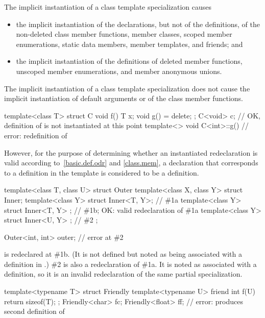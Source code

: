 \pnum
The implicit instantiation of a class template specialization causes
\begin{itemize}
\item
  the implicit instantiation of the declarations, but not of the definitions,
  of the non-deleted
  class member functions,
  member classes,
  scoped member enumerations,
  static data members,
  member templates, and
  friends; and
\item
  the implicit instantiation of the definitions of
  deleted member functions,
  unscoped member enumerations, and
  member anonymous unions.
\end{itemize}
The implicit instantiation of a class template specialization
does not cause the implicit instantiation of
default arguments or 
of the class member functions.
\begin{example}
\begin{codeblock}
template<class T>
struct C {
  void f() { T x; }
  void g() = delete;
};
C<void> c;                      // OK, definition of  is not instantiated at this point
template<> void C<int>::g() { } // error: redefinition of 
\end{codeblock}
\end{example}
However, for the purpose of determining whether an instantiated redeclaration
is valid according to~\ref{basic.def.odr} and \ref{class.mem},
a declaration that corresponds to a definition in the template
is considered to be a definition.
\begin{example}
\begin{codeblock}
template<class T, class U>
struct Outer {
  template<class X, class Y> struct Inner;
  template<class Y> struct Inner<T, Y>;         // \#1a
  template<class Y> struct Inner<T, Y> { };     // \#1b; OK: valid redeclaration of \#1a
  template<class Y> struct Inner<U, Y> { };     // \#2
};

Outer<int, int> outer;                          // error at \#2
\end{codeblock}

 is redeclared at \#1b. (It is not defined
but noted as being associated with a definition in .) \#2
is also a redeclaration of \#1a. It is noted as associated with a definition,
so it is an invalid redeclaration of the same partial specialization.

\begin{codeblock}
template<typename T> struct Friendly {
  template<typename U> friend int f(U) { return sizeof(T); }
};
Friendly<char> fc;
Friendly<float> ff;                             // error: produces second definition of 
\end{codeblock}
\end{example}

